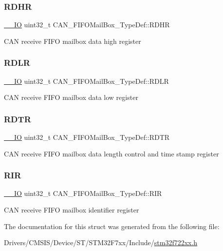 \subsubsection{\texorpdfstring{RDHR}{RDHR}}
{\footnotesize\ttfamily \mbox{\hyperlink{core__sc300_8h_aec43007d9998a0a0e01faede4133d6be}{\+\_\+\+\_\+\+IO}} uint32\+\_\+t C\+A\+N\+\_\+\+F\+I\+F\+O\+Mail\+Box\+\_\+\+Type\+Def\+::\+R\+D\+HR}

C\+AN receive F\+I\+FO mailbox data high register \mbox{\label{struct_c_a_n___f_i_f_o_mail_box___type_def_ac7d62861de29d0b4fcf11fabbdbd76e7}} 
\subsubsection{\texorpdfstring{RDLR}{RDLR}}
{\footnotesize\ttfamily \mbox{\hyperlink{core__sc300_8h_aec43007d9998a0a0e01faede4133d6be}{\+\_\+\+\_\+\+IO}} uint32\+\_\+t C\+A\+N\+\_\+\+F\+I\+F\+O\+Mail\+Box\+\_\+\+Type\+Def\+::\+R\+D\+LR}

C\+AN receive F\+I\+FO mailbox data low register \mbox{\label{struct_c_a_n___f_i_f_o_mail_box___type_def_a49d74ca8b402c2b9596bfcbe4cd051a9}} 
\subsubsection{\texorpdfstring{RDTR}{RDTR}}
{\footnotesize\ttfamily \mbox{\hyperlink{core__sc300_8h_aec43007d9998a0a0e01faede4133d6be}{\+\_\+\+\_\+\+IO}} uint32\+\_\+t C\+A\+N\+\_\+\+F\+I\+F\+O\+Mail\+Box\+\_\+\+Type\+Def\+::\+R\+D\+TR}

C\+AN receive F\+I\+FO mailbox data length control and time stamp register \mbox{\label{struct_c_a_n___f_i_f_o_mail_box___type_def_a034504d43f7b16b320745a25b3a8f12d}} 
\subsubsection{\texorpdfstring{RIR}{RIR}}
{\footnotesize\ttfamily \mbox{\hyperlink{core__sc300_8h_aec43007d9998a0a0e01faede4133d6be}{\+\_\+\+\_\+\+IO}} uint32\+\_\+t C\+A\+N\+\_\+\+F\+I\+F\+O\+Mail\+Box\+\_\+\+Type\+Def\+::\+R\+IR}

C\+AN receive F\+I\+FO mailbox identifier register 

The documentation for this struct was generated from the following file\+:\begin{DoxyCompactItemize}
\item 
Drivers/\+C\+M\+S\+I\+S/\+Device/\+S\+T/\+S\+T\+M32\+F7xx/\+Include/\mbox{\hyperlink{stm32f722xx_8h}{stm32f722xx.\+h}}\end{DoxyCompactItemize}
